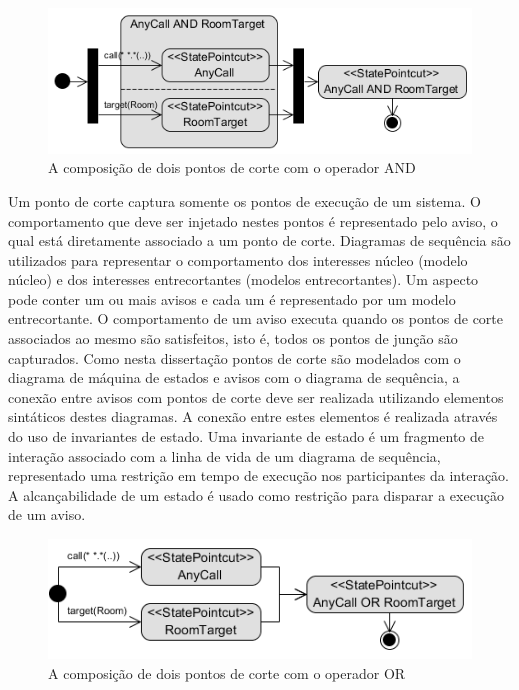 \begin{figure}[h]
	\centering
	\includegraphics{img/pointcut_definition_and.png}
	\caption{A composição de dois pontos de corte com o operador AND}\label{fig:pointcut_definition_and}
\end{figure}

Um ponto de corte captura somente os pontos de execução de um sistema. O comportamento que deve ser injetado nestes pontos é representado pelo aviso,
o qual está diretamente associado a um ponto de corte. Diagramas de sequência são utilizados para representar o comportamento dos interesses núcleo
(modelo núcleo) e dos interesses entrecortantes (modelos entrecortantes). Um aspecto pode conter um ou mais avisos e cada um é representado por um
modelo entrecortante. O comportamento de um aviso executa quando os pontos de corte associados ao mesmo são satisfeitos, isto é, todos os pontos de
junção são capturados. Como nesta dissertação pontos de corte são modelados com o diagrama de máquina de estados e avisos com o diagrama de sequência,
a conexão entre avisos com pontos de corte deve ser realizada utilizando elementos sintáticos destes diagramas. A conexão entre estes elementos é
realizada através do uso de invariantes de estado. Uma invariante de estado é um fragmento de interação associado com a linha de vida de um diagrama
de sequência, representado uma restrição em tempo de execução nos participantes da interação. A alcançabilidade de um estado é usado como restrição
para disparar a execução de um aviso. 

\begin{figure}[!hb]
	\centering
	\includegraphics{img/pointcut_definition_or.png}
	\caption{A composição de dois pontos de corte com o operador OR}\label{fig:pointcut_definition_or}
\end{figure}

